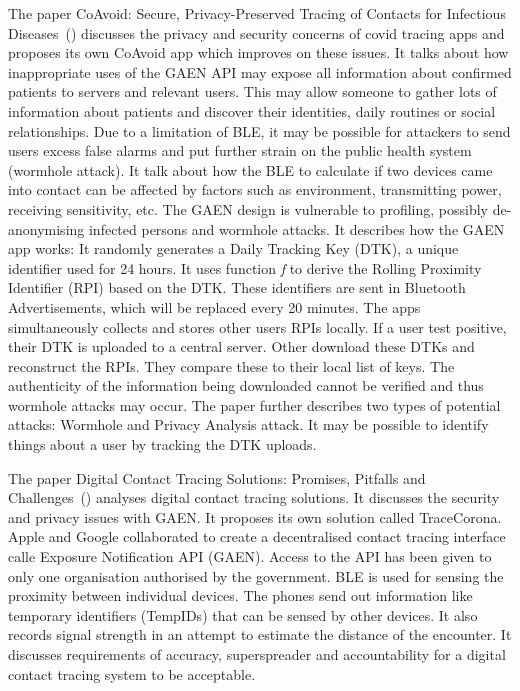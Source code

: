 The paper CoAvoid: Secure, Privacy-Preserved Tracing of
Contacts for Infectious Diseases~(\cite{9908579}) discusses the privacy and security concerns of covid tracing apps and proposes its own CoAvoid app which improves on these issues. It talks about how inappropriate uses of the GAEN API may expose all information about confirmed patients to servers and relevant users. This may allow someone to gather lots of information about patients and discover their identities, daily routines or social relationships. Due to a limitation of BLE, it may be possible for attackers to send users excess false alarms and put further strain on the public health system (wormhole attack). It talk about how the BLE to calculate if two devices came into contact can be affected by factors such as environment, transmitting power, receiving sensitivity, etc. The GAEN design is vulnerable to profiling, possibly de-anonymising infected persons and wormhole attacks. It describes how the GAEN app works: It randomly generates a Daily Tracking Key (DTK), a unique identifier used for 24 hours. It uses function {\it f} to derive the Rolling Proximity Identifier (RPI) based on the DTK. These identifiers are sent in Bluetooth Advertisements, which will be replaced every 20 minutes. The apps simultaneously collects and stores other users RPIs locally. If a user test positive, their DTK is uploaded to a central server. Other download these DTKs and reconstruct the RPIs. They compare these to their local list of keys. The authenticity of the information being downloaded cannot be verified and thus wormhole attacks may occur. The paper further describes two types of potential attacks: Wormhole and Privacy Analysis attack. It may be possible to identify things about a user by tracking the DTK uploads.\par

The paper Digital Contact Tracing Solutions: Promises, Pitfalls
and Challenges~(\cite{9931613}) analyses digital contact tracing solutions. It discusses the security and privacy issues with GAEN. It proposes its own solution called TraceCorona. Apple and Google collaborated to create a decentralised contact tracing interface calle Exposure Notification API (GAEN). Access to the API has been given to only one organisation authorised by the government. BLE is used for sensing the proximity between individual devices. The phones send out information like temporary identifiers (TempIDs) that can be sensed by other devices. It also records signal strength in an attempt to estimate the distance of the encounter. It discusses requirements of accuracy, superspreader and accountability for a digital contact tracing system to be acceptable.\par

